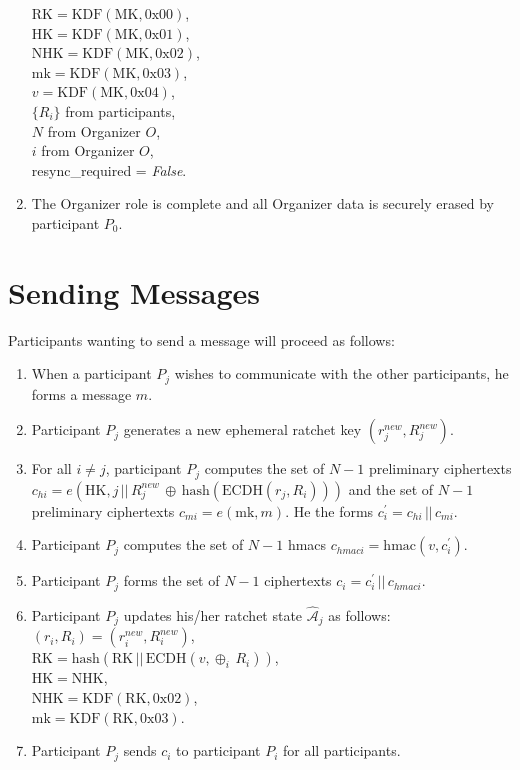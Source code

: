 \documentclass[%
preprint,
amsmath,amssymb,
aps,
prb,
floatfix,
]{revtex4-1}
\begin{document}
\begin{enumerate}
$\mathrm{RK} = \mathrm{KDF}(\mathrm{MK}, 0\mathrm{x}00)$, \\
$\mathrm{HK} = \mathrm{KDF}(\mathrm{MK}, 0\mathrm{x}01)$, \\
$\mathrm{NHK} = \mathrm{KDF}(\mathrm{MK}, 0\mathrm{x}02)$, \\
$\mathrm{mk} = \mathrm{KDF}(\mathrm{MK}, 0\mathrm{x}03)$, \\
$v = \mathrm{KDF}(\mathrm{MK}, 0\mathrm{x}04)$, \\
$\{R_i\}$ from participants, \\
$N$ from Organizer $O$, \\
$i$ from Organizer $O$, \\
resync\_required = \textit{False}.
\item The Organizer role is complete and all Organizer data
is securely erased by participant $P_0$.
\end{enumerate}

\section{\label{sec:sending}Sending Messages}
Participants wanting to send a message will proceed as follows:
\begin{enumerate}
\item When a participant $P_j$ wishes to communicate with the other
participants, he forms a message $m$.
\item Participant $P_j$ generates a new ephemeral ratchet key
$(r_j^{new},R_j^{new})$.
\item For all $i \ne j$, participant $P_j$ computes the set of $N-1$ preliminary ciphertexts $c_{hi} =
e(\mathrm{HK}, j
\, || \, R_j^{new} \, \oplus \, \mathrm{hash}(\mathrm{ECDH}(r_j, R_i)))$ and the
set of $N-1$ preliminary ciphertexts
$c_{mi} = e(\mathrm{mk}, m)$.
He the forms $c_i^\prime = c_{hi} \, || \, c_{mi}$.
\item Participant $P_j$ computes the set of $N-1$ hmacs $c_{hmaci} = \mathrm{hmac}(v, c_i^\prime)$.
\item Participant $P_j$ forms the set of $N-1$ ciphertexts $c_i = c_i^\prime \, || \, c_{hmaci}$.
\item Participant $P_j$ updates his/her ratchet state $\mathcal{\hat{A}}_j$ as
follows:\\
$(r_i, R_i) = (r_i^{new}, R_i^{new})$, \\
$\mathrm{RK} = \mathrm{hash}(\mathrm{RK} \, || \, \mathrm{ECDH}(v, \oplus_i
\, R_i))$, \\
$\mathrm{HK} = \mathrm{NHK}$, \\
$\mathrm{NHK} = \mathrm{KDF}(\mathrm{RK}, 0\mathrm{x}02)$, \\
$\mathrm{mk} = \mathrm{KDF}(\mathrm{RK}, 0\mathrm{x}03)$.
\item Participant $P_j$ sends $c_i $ to participant $P_i$ for all participants.
\end{enumerate}
\end{document}
